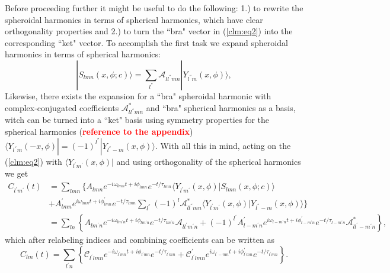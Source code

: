\documentclass[11pt]{article}
\newcommand{\bra}[1]{\langle #1|}
\newcommand{\ket}[1]{|#1\rangle}
\newcommand{\braket}[2]{\langle #1|#2\rangle}
\begin{document}
\noindent
Before proceeding further it might be useful to do the following: 1.) to rewrite the spheroidal harmonics in terms of spherical harmonics, which have clear orthogonality properties and 2.) to turn the ``bra" vector in (\ref{clm:eq2}) into the corresponding ``ket" vector. To accomplish the first task we expand spheroidal harmonics in terms of spherical harmonics:
\begin{equation}
\ket{S_{lmn}(x, \phi ;c)} = \sum_{l^{''}} \mathcal{A}_{ll^{''}mn} \ket{Y_{l^{''}m}(x, \phi)},
\end{equation}
\noindent
Likewise, there exists the expansion for a ``bra" spheroidal harmonic with complex-conjugated coefficients $\mathcal{A}^{*}_{ll^{''}mn}$ and ``bra" spherical harmonics as a basis, witch can be turned into a ``ket" basis using symmetry properties for the spherical harmonics (\textcolor{red}{\bf reference to the appendix}) $\bra{Y_{l^{''}m}(-x, \phi)} = (-1)^{l^{''}} \ket{Y_{l^{''}-m}(x, \phi)}$. With all this in mind, acting on the (\ref{clm:eq2}) with $\bra{Y_{l^{'}m^{'}}(x, \phi)}$ and using orthogonality of the spherical harmonics we get
\begin{equation}
\begin{aligned} \label{clm:eq3}
C_{l^{'}m^{'}}(t) & = \sum_{lmn} \bigg\{ A_{lmn} e^{-i\omega_{lmn}t+i\phi_{lmn}}e^{-t/\tau_{lmn}} \braket{Y_{l^{'}m^{'}}(x, \phi)}{S_{lmn}(x, \phi ;c)}\\
&+ A^{'}_{lmn} e^{i\omega_{lmn}t+i\phi^{'}_{lmn}}e^{-t/\tau_{lmn}} \sum_{l^{''}} (-1)^l \mathcal{A}^{*}_{ll^{''}mn} \braket{Y_{l^{'}m^{'}}(x, \phi)}{Y_{l^{''}-m}(x, \phi)} \bigg\}\\
& = \sum_{ln} \left \{ A_{lm^{'}n} e^{-i\omega_{lm^{'}n}t+i\phi_{lm^{'}n}}e^{-t/\tau_{lm^{'}n}} \mathcal{A}_{ll^{'}m^{'}n} + (-1)^{l^{'}} A^{'}_{l-m^{'}n} e^{i\omega_{l-m^{'}n}t+i\phi^{'}_{l-m^{'}n}}e^{-t/\tau_{l-m^{'}n}} \mathcal{A}^{*}_{ll^{'}-m^{'}n}  \right \},
\end{aligned}
\end{equation}
which after relabeling indices and combining coefficients can be written as 
\begin{equation}
C_{lm}(t) = \sum_{l^{'}n} \left \{ \mathcal{C}_{l^{'}lmn} e^{-i\omega_{l^{'}mn}t+i\phi_{l^{'}mn}}e^{-t/\tau_{l^{'}mn}} + \mathcal{C}^{'}_{l^{'}lmn} e^{i\omega_{l^{'}-mn}t+i\phi^{'}_{l^{'}mn}}e^{-t/\tau_{l^{'}mn}} \right \}.
\end{equation}
\end{document}
